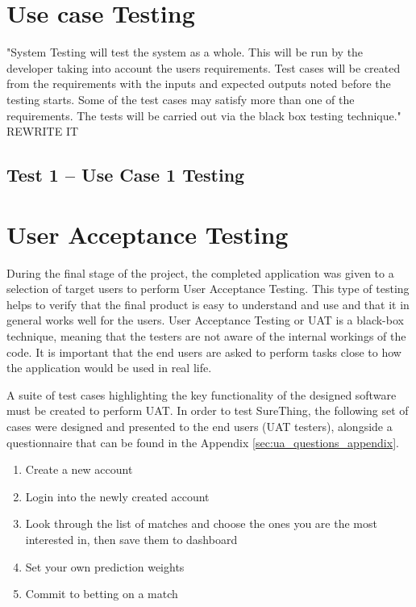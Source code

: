 \section{Use case Testing}
\label{sec:usecase_test}
"System Testing will test the system as a whole. This will be run by the developer taking into account the users requirements. Test cases will be created from the requirements with the inputs and expected outputs noted before the testing starts. Some of the test cases may satisfy more than one of the requirements. The tests will be carried out via the black box testing technique." REWRITE IT

\subsection{Test 1 – Use Case 1 Testing}

\section{User Acceptance Testing}
\label{sec:uat_test}
During the final stage of the project, the completed application was given to a selection of target users to perform User Acceptance Testing. This type of testing helps to verify that the final product is easy to understand and use and that it in general works well for the users. User Acceptance Testing or UAT is a black-box technique, meaning that the testers are not aware of the internal workings of the code. It is important that the end users are asked to perform tasks close to how the application would be used in real life.

A suite of test cases highlighting the key functionality of the designed software must be created to perform UAT. In order to test SureThing, the following set of cases were designed and presented to the end users (UAT testers), alongside a questionnaire that can be found in the Appendix \ref{sec:ua_questions_appendix}.

\begin{enumerate}
   \item Create a new account 
   \item Login into the newly created account
   \item Look through the list of matches and choose the ones you are the most interested in, then save them to dashboard
   \item Set your own prediction weights 
   \item Commit to betting on a match
\end{enumerate}

